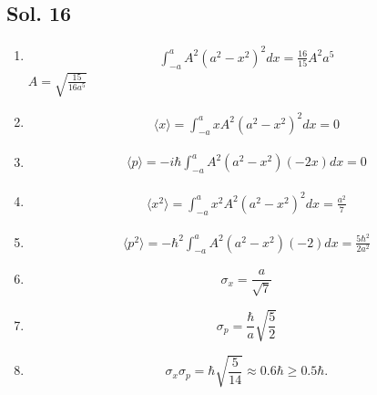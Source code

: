 \subsection*{Sol. 16}


\begin{enumerate}
    \item 
    \begin{align*}
        \int^{a}_{-a}
        A^2(a^2-x^2)^2dx
        =\frac{16}{15}A^2a^5
    \end{align*}
    $A = \sqrt{\frac{15}{16a^5}}$
    \item 
    \begin{align*}
        \langle x \rangle = 
        \int^{a}_{-a}x
        A^2(a^2-x^2)^2dx
        =0
    \end{align*}
    \item 
    \begin{align*}
     \langle p \rangle = 
        -i\hbar\int^{a}_{-a}
        A^2(a^2-x^2)(-2x)dx
        =0
    \end{align*}
    \item 
    \begin{align*}
        \langle x^2 \rangle = 
        \int^{a}_{-a}x^2
        A^2(a^2-x^2)^2dx
        = \frac{a^2}{7}
    \end{align*}
    \item 
    \begin{align*}
        \langle p^2 \rangle = 
        -\hbar^2
        \int^{a}_{-a}
        A^2(a^2-x^2)(-2)dx
        = \frac{5\hbar^2}{2a^2}
    \end{align*}
    \item $$\sigma_x = \frac{a}{\sqrt{7}}$$
    \item $$\sigma_p = \frac{\hbar}{a}\sqrt{\frac{5}{2}}$$
    \item $$
    \sigma_x\sigma_p = \hbar \sqrt{\frac{5}{14}}\approx0.6\hbar\geq 0.5\hbar.
    $$
\end{enumerate}

